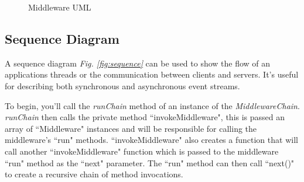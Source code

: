 \documentclass[12pt]{article}
\newcommand{\umlref}[1]{\textit{Fig. \ref{#1}}}
\begin{document}
\begin{figure}
\caption{Middleware UML} \label{fig:middleware}
\centering
{}
\end{figure}
\subsection{Sequence Diagram}

A sequence diagram \umlref{fig:sequence} can be used to show the flow of an applications threads or the communication between clients and servers. It's useful for describing both synchronous and asynchronous event streams.
\par To begin, you'll call the \textit{runChain} method of an instance of the \textit{MiddlewareChain}. \textit{runChain} then calls the private method ``invokeMiddleware", this is passed an array of ``Middleware" instances and will be responsible for calling the middleware's ``run" methods. ``invokeMiddleware" also creates a function that will call another ``invokeMiddleware" function which is passed to the middleware ``run" method as the ``next" parameter. The ``run" method can then call ``next()" to create a recursive chain of method invocations.
\end{document}

